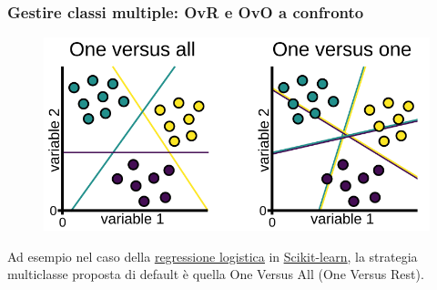 \begin{frame}
	
	\frametitle{Gestire classi multiple: OvR e OvO a confronto}
	
	\begin{figure}[!htbp]
		\centering
		\includegraphics[width=0.85\linewidth]{images/supervised/multiple_classes/OvR_OvO.png}
	\end{figure}
	
	Ad esempio nel caso della \underline{\href{https://scikit-learn.org/stable/modules/generated/sklearn.linear_model.LogisticRegression.html}{regressione logistica}} in \underline{\href{https://scikit-learn.org/stable/modules/multiclass.html}{Scikit-learn}}, la strategia multiclasse proposta di default è quella One Versus All (One Versus Rest).
	
\end{frame}